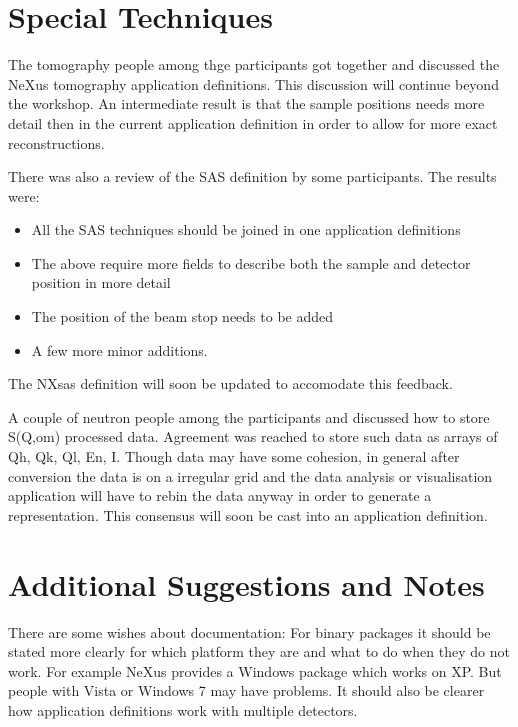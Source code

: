 \documentclass[a4paper]{article}\usepackage[dvips]{graphicx}
\begin{document}
\section{Special Techniques }

The tomography people among thge participants got together and discussed the NeXus tomography 
application definitions. This discussion will continue beyond the workshop. An intermediate 
result is that the sample positions needs more detail then in the current application definition in 
order to allow for more exact reconstructions. 


There was also a review of the SAS definition by some participants. The results were:


\begin{itemize}\item All the SAS techniques should be joined in one application definitions
\item The above require more fields to describe both the sample and detector 
  position in more detail
\item The position of the beam stop needs to be added
\item A few more minor additions.
\end{itemize}The NXsas definition will soon be updated to accomodate this feedback.



A couple of neutron people among the participants and discussed how to store S(Q,om) 
processed data. Agreement was reached to store such data as arrays of Qh, Qk, Ql, En, I. 
Though data may have some cohesion, in general after conversion the data is on a irregular 
grid and the data analysis or visualisation application will have to rebin the data anyway 
in order to generate a representation. This consensus will soon be cast into an application 
definition.
 



\section{Additional Suggestions and Notes  }

There are some wishes about documentation: For binary packages it should be stated more 
clearly for which platform they are and what to do when they do not work. For example 
NeXus provides a Windows package which works on XP. But people with Vista or Windows 7 
may have problems. It should also be clearer how application definitions work with 
multiple detectors.
\end{document}
